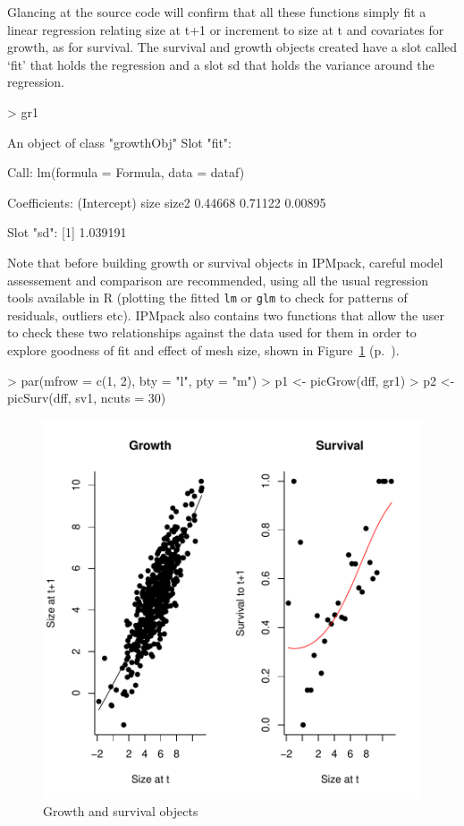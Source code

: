 \documentclass{article}
\begin{document}
Glancing at the source code will confirm that all these functions simply fit a linear regression relating size at t+1 or increment to size at t and covariates for growth, as for survival. The survival and growth objects created have a slot called `fit' that holds the regression and a slot sd that holds the variance around the regression. 
\begin{Schunk}
\begin{Sinput}
> gr1
\end{Sinput}
\begin{Soutput}
An object of class "growthObj"
Slot "fit":

Call:
lm(formula = Formula, data = dataf)

Coefficients:
(Intercept)         size        size2  
    0.44668      0.71122      0.00895  


Slot "sd":
[1] 1.039191
\end{Soutput}
\end{Schunk}
Note that before building growth or survival objects in IPMpack, careful model assessement and comparison are recommended, using all the usual regression tools available in R (plotting the fitted {\tt lm} or {\tt glm} to check for patterns of residuals, outliers etc). IPMpack also contains two functions that allow the user to check these two relationships against the data used for them in order to explore goodness of fit and effect of mesh size, shown in Figure~\ref{fig:one} (p.~\pageref{fig:one}).
\begin{Schunk}
\begin{Sinput}
> par(mfrow = c(1, 2), bty = "l", pty = "m")
> p1 <- picGrow(dff, gr1)
> p2 <- picSurv(dff, sv1, ncuts = 30)
\end{Sinput}
\end{Schunk}
\begin{figure}
\begin{center}
\includegraphics{IPMpack_Vignette-fig1}
\end{center}
\caption{Growth and survival objects}
\label{fig:one}
\end{figure}
\end{document}
